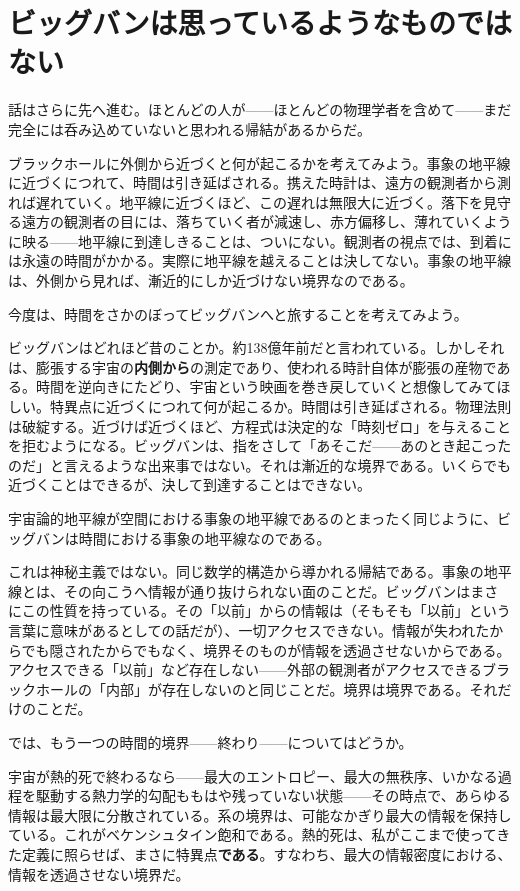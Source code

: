 \documentclass[11pt, twoside, openright]{book}
\begin{document}
\section*{ビッグバンは思っているようなものではない}

話はさらに先へ進む。ほとんどの人が------ほとんどの物理学者を含めて------まだ完全には呑み込めていないと思われる帰結があるからだ。

ブラックホールに外側から近づくと何が起こるかを考えてみよう。事象の地平線に近づくにつれて、時間は引き延ばされる。携えた時計は、遠方の観測者から測れば遅れていく。地平線に近づくほど、この遅れは無限大に近づく。落下を見守る遠方の観測者の目には、落ちていく者が減速し、赤方偏移し、薄れていくように映る------地平線に到達しきることは、ついにない。観測者の視点では、到着には永遠の時間がかかる。実際に地平線を越えることは決してない。事象の地平線は、外側から見れば、漸近的にしか近づけない境界なのである。

今度は、時間をさかのぼってビッグバンへと旅することを考えてみよう。

ビッグバンはどれほど昔のことか。約138億年前だと言われている。しかしそれは、膨張する宇宙の\textbf{内側から}の測定であり、使われる時計自体が膨張の産物である。時間を逆向きにたどり、宇宙という映画を巻き戻していくと想像してみてほしい。特異点に近づくにつれて何が起こるか。時間は引き延ばされる。物理法則は破綻する。近づけば近づくほど、方程式は決定的な「時刻ゼロ」を与えることを拒むようになる。ビッグバンは、指をさして「あそこだ------あのとき起こったのだ」と言えるような出来事ではない。それは漸近的な境界である。いくらでも近づくことはできるが、決して到達することはできない。

宇宙論的地平線が空間における事象の地平線であるのとまったく同じように、ビッグバンは時間における事象の地平線なのである。

これは神秘主義ではない。同じ数学的構造から導かれる帰結である。事象の地平線とは、その向こうへ情報が通り抜けられない面のことだ。ビッグバンはまさにこの性質を持っている。その「以前」からの情報は（そもそも「以前」という言葉に意味があるとしての話だが）、一切アクセスできない。情報が失われたからでも隠されたからでもなく、境界そのものが情報を透過させないからである。アクセスできる「以前」など存在しない------外部の観測者がアクセスできるブラックホールの「内部」が存在しないのと同じことだ。境界は境界である。それだけのことだ。

では、もう一つの時間的境界------終わり------についてはどうか。

宇宙が熱的死で終わるなら------最大のエントロピー、最大の無秩序、いかなる過程を駆動する熱力学的勾配ももはや残っていない状態------その時点で、あらゆる情報は最大限に分散されている。系の境界は、可能なかぎり最大の情報を保持している。これがベケンシュタイン飽和である。熱的死は、私がここまで使ってきた定義に照らせば、まさに特異点\textbf{である}。すなわち、最大の情報密度における、情報を透過させない境界だ。
\end{document}
